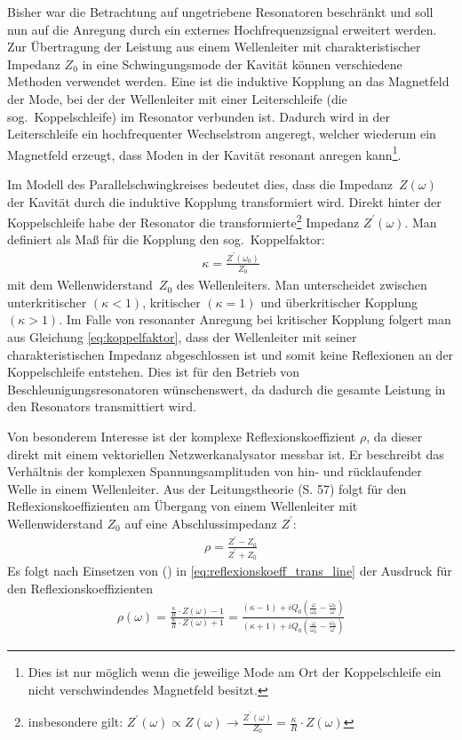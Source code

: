 Bisher war die Betrachtung auf ungetriebene Resonatoren beschränkt und soll nun auf die Anregung durch ein externes Hochfrequenzsignal erweitert werden.
Zur Übertragung der Leistung aus einem Wellenleiter mit charakteristischer Impedanz $Z_0$ in eine Schwingungsmode der Kavität können verschiedene Methoden verwendet werden.
Eine ist die induktive Kopplung an das Magnetfeld der Mode, bei der der Wellenleiter mit einer Leiterschleife (die sog.\ Koppelschleife) im Resonator verbunden ist.
Dadurch wird in der Leiterschleife ein hochfrequenter Wechselstrom angeregt, welcher wiederum ein Magnetfeld erzeugt, dass Moden in der Kavität resonant anregen kann\footnote{Dies ist nur möglich wenn die jeweilige Mode am Ort der Koppelschleife ein nicht verschwindendes Magnetfeld besitzt.}.

Im Modell des Parallelschwingkreises bedeutet dies, dass die Impedanz~$Z(\omega)$ der Kavität durch die induktive Kopplung transformiert wird.
Direkt hinter der Koppelschleife habe der Resonator die transformierte\footnote{insbesondere gilt: $Z^\prime(\omega) \propto Z(\omega) \longrightarrow \frac{Z^\prime(\omega)}{Z_0} = \frac{\kappa}{R} \cdot Z(\omega)$ } Impedanz $Z^\prime(\omega)$.
Man definiert als Maß für die Kopplung den sog.\ Koppelfaktor:
\begin{align}
  \kappa = \frac{Z^\prime(\omega_0)}{Z_0}
  \label{eq:koppelfaktor}
\end{align}
mit dem Wellenwiderstand~$Z_0$ des Wellenleiters.
Man unterscheidet zwischen unterkritischer $(\kappa < 1)$, kritischer $(\kappa = 1)$ und überkritischer Kopplung $(\kappa > 1)$.
Im Falle von resonanter Anregung bei kritischer Kopplung folgert man aus Gleichung \eqref{eq:koppelfaktor}, dass der Wellenleiter mit seiner charakteristischen Impedanz abgeschlossen ist und somit keine Reflexionen an der Koppelschleife entstehen.
Dies ist für den Betrieb von Beschleunigungsresonatoren wünschenswert, da dadurch die gesamte Leistung in den Resonators transmittiert wird.

Von besonderem Interesse ist der komplexe Reflexionskoeffizient $\rho$, da dieser direkt mit einem vektoriellen Netzwerkanalysator messbar ist.
Er beschreibt das Verhältnis der komplexen Spannungsamplituden von hin- und rücklaufender Welle in einem Wellenleiter.
Aus der Leitungstheorie \cite{pozar} (S. 57) folgt für den Reflexionskoeffizienten am Übergang von einem Wellenleiter mit Wellenwiderstand $Z_0$ auf eine Abschlussimpedanz $Z^\prime$:
\begin{align}
  \rho = \frac{Z^\prime - Z_0}{Z^\prime + Z_0}
  \label{eq:reflexionskoeff_trans_line}
\end{align}
Es folgt nach Einsetzen von () in \eqref{eq:reflexionskoeff_trans_line} der Ausdruck für den Reflexionskoeffizienten 
\begin{align}
  \rho(\omega) = \frac{\frac{\kappa}{R} \cdot Z(\omega) - 1}{\frac{\kappa}{R} \cdot Z(\omega) + 1} = \frac{(\kappa - 1) + i  Q_0 \left( \frac{\omega}{\omega_0}  - \frac{\omega_0}{\omega}\right)}{\left( \kappa + 1 \right) + i  Q_0 \left( \frac{\omega}{\omega_0}  - \frac{\omega_0}{\omega}\right)}
\end{align}

